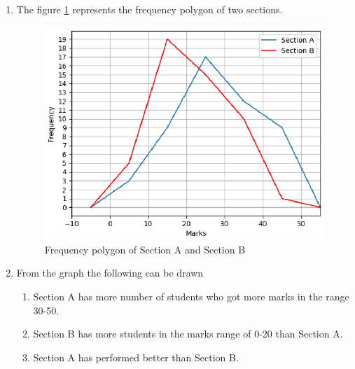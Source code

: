 \renewcommand{\theequation}{\theenumi}
\begin{enumerate}[label=\thesection.\arabic*.,ref=\thesection.\theenumi]
\item The figure \ref{fig:freqpoly1} represents the frequency polygon of two sections.
\begin{figure}[!ht]
\centering
\includegraphics[width= \columnwidth]{./statistics/figs/Q42.eps}
\caption{Frequency polygon of Section A and Section B}
\label{fig:freqpoly1}
\end{figure}
\item From the graph the following can be drawn
\begin{enumerate}
\item Section A has more number of students who got more marks in the range 30-50.
\item Section B has more students in the marks range of 0-20 than Section A.
\item Section A has performed better than Section B.
\end{enumerate}
\end{enumerate}